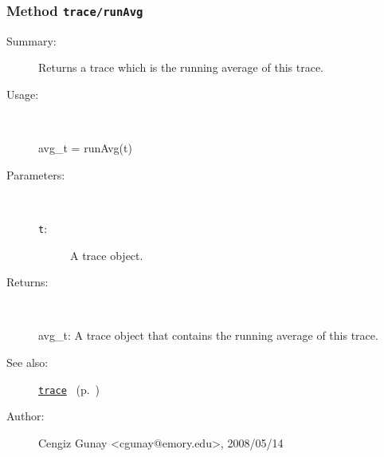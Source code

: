 \subsubsection[Method \texttt{runAvg}]{Method \texttt{trace/runAvg}}%
%
\label{ref_trace__runAvg}%
\hypertarget{ref_trace__runAvg}{}%
\begin{description}
\item[Summary:]Returns a trace which is the running average of this trace.
%
\item[Usage:]~%
\begin{lyxcode}%
avg\_t = runAvg(t)
%
\end{lyxcode}%
%
%
\item[Parameters:]~
\begin{description}%
\item[\texttt{t}:]
 A trace object.
\end{description}%
%
\item[Returns:
]~

	avg\_t: A trace object that contains the running average of this trace.
%
%
\item[See also:]%
\hyperlink{ref_trace}{\texttt{trace}}%
\ (p.~\pageref{ref_trace})%
%
%
\item[Author:]%
Cengiz Gunay <cgunay@emory.edu>, 2008/05/14
%
\end{description}
\methodline%

